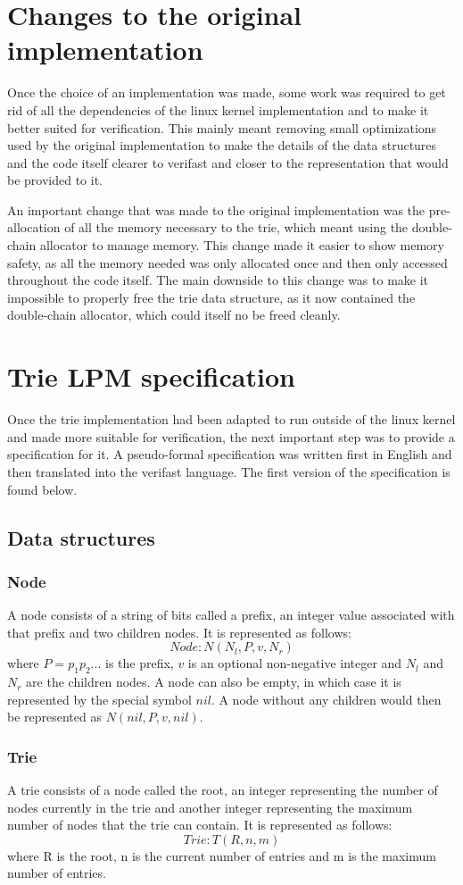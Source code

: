 \documentclass{article}
\begin{document}
\section{Changes to the original implementation}
Once the choice of an implementation was made, some work was required to get rid of
all the dependencies of the linux kernel implementation and to make it better suited
for verification. This mainly meant removing small optimizations used by the original
implementation to make the details of the data structures and the code itself clearer
to verifast and closer to the representation that would be provided to it. \par
An important change that was made to the original implementation was the pre-allocation
of all the memory necessary to the trie, which meant using the double-chain allocator
to manage memory. This change made it easier to show memory safety, as all the
memory needed was only allocated once and then only accessed throughout the code
itself. The main downside to this change was to make it impossible to properly free
the trie data structure, as it now contained the double-chain allocator, which could
itself no be freed cleanly.
\section{Trie LPM specification}
Once the trie implementation had been adapted to run outside of the linux kernel and
made more suitable for verification, the next important step was to provide a specification
for it. A pseudo-formal specification was written first in English and then translated
into the verifast language. The first version of the specification is found below.
\subsection{Data structures}
\subsubsection{Node}
A node consists of a string of bits called a prefix, an integer value
associated with that prefix and two children nodes. It is represented
as follows:
\[
    Node: N(N_l, P, v, N_r)
\]
where $P = p_1p_2...$ is the prefix, $v$ is an optional non-negative integer and
$N_l$ and $N_r$ are the children nodes. A node can also be empty, in which case
it is represented by the special symbol $nil$. A node without any children would
then be represented as $N(nil, P, v, nil)$.
\subsubsection{Trie}
A trie consists of a node called the root, an integer representing the
number of nodes currently in the trie and another integer representing the
maximum number of nodes that the trie can contain. It is represented as follows:
\[
    Trie: T(R, n, m)
\]
where R is the root, n is the current number of entries and m is the maximum
number of entries.
\end{document}
